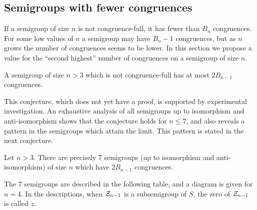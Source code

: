 \subsection{Semigroups with fewer congruences}

If a semigroup of size $n$ is not congruence-full, it has fewer than $B_n$
congruences.  For some low values of $n$ a semigroup may have $B_n - 1$
congruences, but as $n$ grows the number of congruences seems to be lower.  In
this section we propose a value for the ``second highest'' number of congruences
on a semigroup of size $n$.

\begin{conjecture}
  \label{conj:not-cong-full}
  A semigroup of size $n > 3$ which is not congruence-full has at most
  $2B_{n-1}$ congruences.
\end{conjecture}

This conjecture, which does not yet have a proof, is supported by experimental
investigation.  An exhaustive analysis of all semigroups up to isomorphism and
anti-isomorphism shows that the conjecture holds for $n \leq 7$, and also
reveals a pattern in the semigroups which attain the limit.  This pattern is
stated in the next conjecture.

\begin{conjecture}
  \label{conj:cong-nearfull-7}
  Let $n > 3$.  There are precisely 7 semigroups (up to isomorphism and
  anti-isomorphism) of size $n$ which have $2B_{n-1}$ congruences.
\end{conjecture}

The 7 semigroups are described in the following table, and a diagram is given
for $n = 4$.  In the descriptions, when $\mathcal{Z}_{n-1}$ is a subsemigroup of $S$, the
zero of $\mathcal{Z}_{n-1}$ is called $z$.

